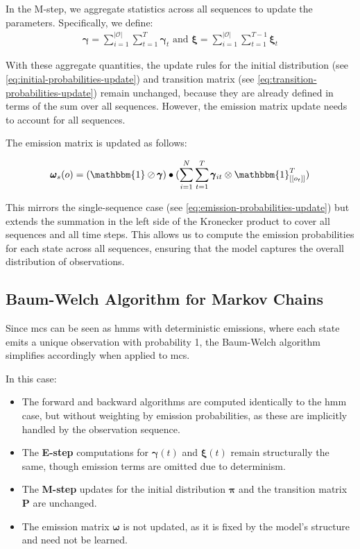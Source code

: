 In the M-step, we aggregate statistics across all sequences to update the parameters.
Specifically, we define:
\begin{align}
    \pmb{\gamma} = \sum_{i=1}^{|\mathcal{O}|}\sum_{t=1}^{T} \pmb{\gamma}_t
    \text{ and }
    \pmb{\xi} = \sum_{i=1}^{|\mathcal{O}|}\sum_{t=1}^{T-1} \pmb{\xi}_t
\end{align}

With these aggregate quantities, the update rules for the initial distribution (see \autoref{eq:initial-probabilities-update}) and transition matrix (see \autoref{eq:transition-probabilities-update}) remain unchanged, because they are already defined in terms of the sum over all sequences.
However, the emission matrix update needs to account for all sequences.

The emission matrix is updated as follows:


\begin{equation}
    \pmb{\omega}
    _s(o) = (\mathbbm{1} \oslash \pmb{\gamma}) \bullet (\sum_{i=1}^N \sum_{t=1}^{T} \pmb{\gamma}_{it} \otimes \mathbbm{1}_{[[o_t]]}^{T})
    \label{eq:omega-update}
\end{equation}


This mirrors the single-sequence case (see \autoref{eq:emission-probabilities-update}) but extends the summation in the left side of the Kronecker product to cover all sequences and all time steps.
This allows us to compute the emission probabilities for each state across all sequences, ensuring that the model captures the overall distribution of observations.

\subsection{Baum-Welch Algorithm for Markov Chains}\label{subsec:baum-welch-mc}
Since \glspl{mc} can be seen as \glspl{hmm} with deterministic emissions, where each state emits a unique observation with probability 1, the Baum-Welch algorithm simplifies accordingly when applied to \glspl{mc}.

In this case:

\begin{itemize}
    \item The forward and backward algorithms are computed identically to the \gls{hmm} case, but without weighting by emission probabilities, as these are implicitly handled by the observation sequence.
    \item The \textbf{E-step} computations for $\pmb{\gamma}(t)$ and $\pmb{\xi}(t)$ remain structurally the same, though emission terms are omitted due to determinism.
    \item The \textbf{M-step} updates for the initial distribution $\pmb{\pi}$ and the transition matrix $\pmb{P}$ are unchanged.
    \item The emission matrix $\pmb{\omega}$ is not updated, as it is fixed by the model's structure and need not be learned.
\end{itemize}

